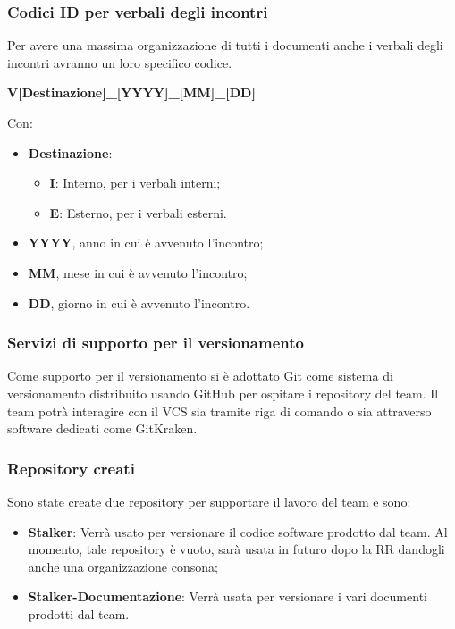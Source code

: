 \subsubsection{Codici ID per verbali degli incontri}
Per avere una massima organizzazione di tutti i documenti anche i verbali degli incontri avranno un loro specifico codice.
\begin{center}
	\textbf{V[Destinazione]\_[YYYY]\_[MM]\_[DD]}
\end{center}
Con:
\begin{itemize}
\item \textbf{Destinazione}:
	\begin{itemize}
		\item \textbf{I}: Interno, per i verbali interni;
		\item \textbf{E}: Esterno, per i verbali esterni.
	\end{itemize}	
\item \textbf{YYYY}, anno in cui è avvenuto l’incontro;
\item \textbf{MM}, mese in cui è avvenuto l’incontro;
\item \textbf{DD}, giorno in cui è avvenuto l’incontro.
	
\end{itemize}

\subsubsection{Servizi di supporto per il versionamento} 
Come supporto per il versionamento si è adottato Git come sistema di versionamento distribuito usando GitHub per ospitare i repository del team. Il team potrà interagire con il VCS sia tramite riga di comando o sia attraverso software dedicati come GitKraken.

\subsubsection{Repository creati}
Sono state create due repository per supportare il lavoro del team e sono:
\begin{itemize}
\item \textbf{Stalker}: Verrà usato per versionare il codice software prodotto dal team. Al momento, tale repository è vuoto, sarà usata in futuro dopo la RR dandogli anche una organizzazione consona;
\item \textbf{Stalker-Documentazione}: Verrà usata per versionare i vari documenti prodotti dal team.
\end{itemize}

